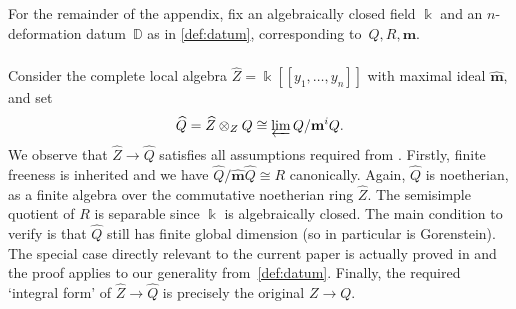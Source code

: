\documentclass{amsart}
\numberwithin{equation}{section}
\theoremstyle{definition}
\theoremstyle{remark}
\newcommand{\bk}{\Bbbk}
\newcommand{\fm}{\mathbf{m}}
\newcommand{\mD}{\mathbb{D}}
\begin{document}
For the remainder of the appendix, fix an algebraically closed field $\bk$ and an $n$-deformation datum~$\mD$ as in \ref{def:datum}, corresponding to~$Q,R,\fm$.

\subsubsection{}
Consider the complete local algebra $\widehat{Z}=\bk[[y_1,\ldots, y_n]]$ with maximal ideal $\widehat{\fm}$, and set
\[\widehat{Q}=\widehat{Z}\otimes_{Z}Q\cong \varprojlim Q/\fm^i Q.\]
We observe that $\widehat{Z}\to \widehat{Q}$ satisfies all assumptions required from \cite[\S 2.1- 2.2]{NP1}. Firstly, finite freeness is inherited and we have $\widehat{Q}/\widehat{\fm}\widehat{Q}\cong R$ canonically. Again, $\widehat{Q}$ is noetherian, as a finite algebra over the commutative noetherian ring $\widehat{Z}$. The semisimple quotient of $R$ is separable since $\bk$ is algebraically closed. The main condition to verify is that $\widehat{Q}$ still has finite global dimension (so in particular is Gorenstein). The special case directly relevant to the current paper is actually proved in \cite[Lemma~2.10]{NP2} and the proof applies to our generality from~\ref{def:datum}. Finally, the required `integral form' of $\widehat{Z}\to\widehat Q$ is precisely the original $Z\to Q$.
\end{document}
